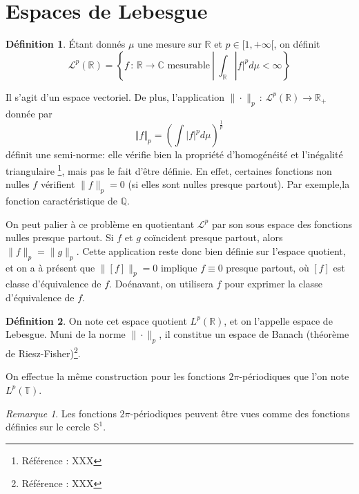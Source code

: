 \documentclass[]{article}
\theoremstyle{remark}
\newtheorem{myrem}{Remarque}
\theoremstyle{definition}
\newtheorem{mydef}{Définition}
\newcommand{\funcshort}[3]{
	#1 \, : \, #2 \longrightarrow #3
}
\begin{document}
	\section{Espaces de Lebesgue}
	
		\begin{mydef}
			Étant donnés $\mu$ une mesure sur $\mathbb{R}$ et $p \in [1, +\infty[$, on définit
				$$ \mathcal{L}^{p} (\mathbb{R}) = \left \{ \funcshort{f}{\mathbb{R}}{\mathbb{C}} \text{ mesurable} ~|~ \int_{\mathbb{R}}|f|^p d\mu < \infty \right \} $$
		\end{mydef}
	
		Il s'agit d'un espace vectoriel. De plus, l'application $\funcshort{\| \cdot \|_p}{\mathcal{L}^p(\mathbb{R})}{\mathbb{R}_+}$ donnée par
		 $$\Vert f \Vert_p = \left( \int|f|^pd\mu \right)^{\frac{1}{p}} $$ 
		 définit une semi-norme: elle vérifie bien la propriété d'homogénéité et l'inégalité triangulaire \footnote{Référence : XXX}, mais pas le fait d'être définie. En effet, certaines fonctions non nulles $f$ vérifient $\|f\|_p = 0$ (si elles sont nulles presque partout). Par exemple,la fonction caractéristique de $\mathbb{Q}$. 
		 
		 On peut palier à ce problème en quotientant $\mathcal{L}^p$ par son sous espace des fonctions nulles presque partout. Si $f$ et $g$ coïncident presque partout, alors
		 $\|f\|_p = \|g\|_p$. Cette application reste donc bien définie sur l'espace quotient, et on a à présent que $ \|[f]\|_p = 0$ implique $f \equiv 0$ presque partout, où $[f]$ est classe d'équivalence de $f$. 
		 Doénavant, on utilisera $f$ pour exprimer la classe d'équivalence de $f$.
		 
		 \begin{mydef} 
		 	On note cet espace quotient $L^p(\mathbb{R})$, et on l'appelle espace de Lebesgue. Muni de la norme $\| \cdot \|_p$, il constitue un espace de Banach (théorème de Riesz-Fisher)\footnote{Référence : XXX}. 
		 \end{mydef}
		 
		On effectue la même construction pour les fonctions $2\pi$-périodiques que l'on note $L^p(\mathbb{T})$.
		
		\begin{myrem}
			Les fonctions $2\pi$-périodiques peuvent être vues comme des fonctions définies sur le cercle $\mathbb{S}^1$.
		\end{myrem}

		
	
\end{document}
